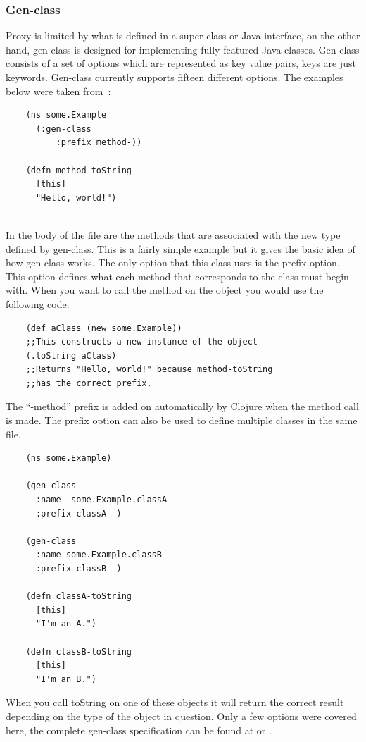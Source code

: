 \documentclass[12pt]{article}
\begin{document}
	\subsubsection{Gen-class}
	Proxy is limited by what is defined in a super class or Java interface, on the other hand, gen-class is designed for implementing fully featured Java classes. Gen-class consists of a set of options which are represented as key value pairs, keys are just keywords. Gen-class currently supports fifteen different options. The examples below were taken from~\cite{kotka}:
	
	\begin{verbatim}
	(ns some.Example
	  (:gen-class 
	      :prefix method-))
	  
	(defn method-toString
	  [this]
	  "Hello, world!")
	  
	\end{verbatim}
	
	In the body of the file are the methods that are associated with the new type defined by gen-class. This is a fairly simple example but it gives the basic idea of how gen-class works. The only option that this class uses is the prefix option. This option defines what each method that corresponds to the class must begin with. When you want to call the method on the object you would use the following code:
	
	\begin{verbatim}
	(def aClass (new some.Example))
	;;This constructs a new instance of the object
	(.toString aClass)
	;;Returns "Hello, world!" because method-toString 
	;;has the correct prefix.
	\end{verbatim}
	
	The ``-method'' prefix is added on automatically by Clojure when the method call is made. The prefix option can also be used to define multiple classes in the same file.
	
	\begin{verbatim}
	(ns some.Example)
	
	(gen-class
	  :name  some.Example.classA
	  :prefix classA- )
	  
	(gen-class
	  :name some.Example.classB
	  :prefix classB- )
	  
	(defn classA-toString
	  [this]
	  "I'm an A.")
	  
	(defn classB-toString
	  [this]
	  "I'm an B.")
	\end{verbatim}
	
	When you call toString on one of these objects it will return the correct result depending on the type of the object in question. Only a few options were covered here, the complete gen-class specification can be found at \cite{docs:genClass} or \cite{api:genClass}. 
\end{document}
